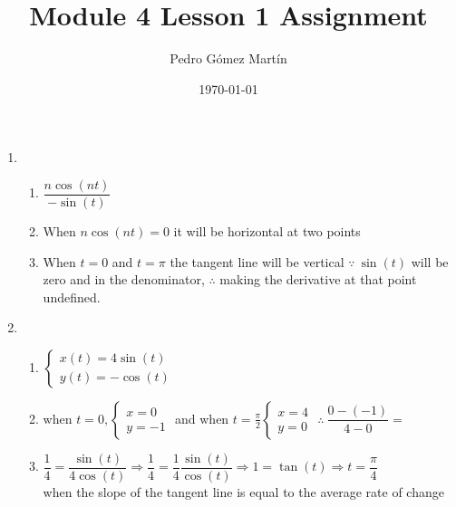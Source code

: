 \documentclass{article}
\author{Pedro G\'{o}mez Mart\'{i}n}
\date{\today}
\title{Module 4 Lesson 1 Assignment}
\begin{document}
\maketitle

\begin{enumerate}[label=\arabic*)]
	\item
	\begin{enumerate}[label=(\alph*)]
		\item	$\dfrac{n\cos(nt)}{-\sin(t)}$
		\item	When $n\cos(nt)=0$ it will be horizontal at two points
		\item	When $t=0$ and $t=\pi$ the tangent line will be vertical $\because\ \sin(t)$ will be zero and in the denominator, $\therefore$ making the derivative at that point undefined. 
	\end{enumerate}
	\item
	\begin{enumerate}[label=(\alph*)]
		\item	$\begin{cases}
						x(t)=4\sin(t)\\
						y(t)=-\cos(t)
				\end{cases}$
		\item	when $t=0, \begin{cases}
								x=0\\
								y=-1
							\end{cases}$ and when $t=\frac{\pi}{2} 
							\begin{cases}
								x=4\\
								y=0
							\end{cases}$ $\therefore\ \dfrac{0-(-1)}{4-0} =$
		\item	$\dfrac{1}{4}=\dfrac{\sin(t)}{4\cos(t)}\Rightarrow\dfrac{1}{4}=\dfrac{1}{4}\dfrac{\sin(t)}{\cos(t)}\Rightarrow 1=\tan(t)\Rightarrow t=\dfrac{\pi}{4}$\\
		when  the slope of the tangent line is equal to the average rate of change
	\end{enumerate}
\end{enumerate}
\end{document}
